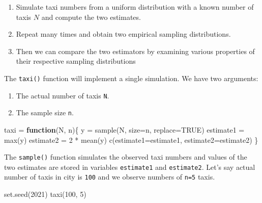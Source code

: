 \documentclass[
]{book}
\newenvironment{Shaded}{\begin{snugshade}}{\end{snugshade}}
\newcommand{\AttributeTok}[1]{\textcolor[rgb]{0.77,0.63,0.00}{#1}}
\newcommand{\ConstantTok}[1]{\textcolor[rgb]{0.00,0.00,0.00}{#1}}
\newcommand{\ControlFlowTok}[1]{\textcolor[rgb]{0.13,0.29,0.53}{\textbf{#1}}}
\newcommand{\DecValTok}[1]{\textcolor[rgb]{0.00,0.00,0.81}{#1}}
\newcommand{\FunctionTok}[1]{\textcolor[rgb]{0.00,0.00,0.00}{#1}}
\newcommand{\NormalTok}[1]{#1}
\newcommand{\OtherTok}[1]{\textcolor[rgb]{0.56,0.35,0.01}{#1}}
\newcommand{\SpecialCharTok}[1]{\textcolor[rgb]{0.00,0.00,0.00}{#1}}
\providecommand{\tightlist}{%
  \setlength{\itemsep}{0pt}\setlength{\parskip}{0pt}}
\begin{document}
\begin{enumerate}
\def\labelenumi{\arabic{enumi}.}
\tightlist
\item
  Simulate taxi numbers from a uniform distribution with a known number of taxis \(N\) and compute the two estimates.
\item
  Repeat many times and obtain two empirical sampling distributions.
\item
  Then we can compare the two estimators by examining various properties of their respective sampling distributions
\end{enumerate}

The \texttt{taxi()} function will implement a single simulation. We have two arguments:

\begin{enumerate}
\def\labelenumi{\arabic{enumi}.}
\tightlist
\item
  The actual number of taxis \texttt{N}.
\item
  The sample size \texttt{n}.
\end{enumerate}

\begin{Shaded}
\begin{Highlighting}[]
\NormalTok{taxi }\OtherTok{=} \ControlFlowTok{function}\NormalTok{(N, n)\{}
\NormalTok{  y }\OtherTok{=} \FunctionTok{sample}\NormalTok{(N, }\AttributeTok{size=}\NormalTok{n, }\AttributeTok{replace=}\ConstantTok{TRUE}\NormalTok{)}
\NormalTok{  estimate1 }\OtherTok{=} \FunctionTok{max}\NormalTok{(y)}
\NormalTok{  estimate2 }\OtherTok{=} \DecValTok{2} \SpecialCharTok{*} \FunctionTok{mean}\NormalTok{(y)}
  \FunctionTok{c}\NormalTok{(}\AttributeTok{estimate1=}\NormalTok{estimate1, }\AttributeTok{estimate2=}\NormalTok{estimate2)}
\NormalTok{\}}
\end{Highlighting}
\end{Shaded}

The \texttt{sample()} function simulates the observed taxi numbers and values of the two estimates are stored in variables \texttt{estimate1} and \texttt{estimate2}. Let's say actual number of taxis in city is \texttt{100} and we observe numbers of \texttt{n=5} taxis.

\begin{Shaded}
\begin{Highlighting}[]
\FunctionTok{set.seed}\NormalTok{(}\DecValTok{2021}\NormalTok{)}
\FunctionTok{taxi}\NormalTok{(}\DecValTok{100}\NormalTok{, }\DecValTok{5}\NormalTok{)}
\end{Highlighting}
\end{Shaded}
\end{document}
